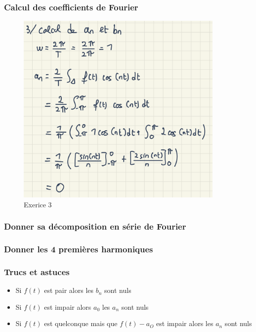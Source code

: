 \documentclass[12pt, a4paper]{article}
\begin{document}
\subsubsection{Calcul des coefficients de Fourier}
\begin{figure}[H]
    \centering
    \includegraphics[width=0.9\textwidth]{img/exo3.png}
    \caption{Exerice 3}
    \label{fig:exo3}
\end{figure}
\subsubsection{Donner sa décomposition en série de Fourier}

\subsubsection{Donner les 4 premières harmoniques}

\subsubsection{Trucs et astuces}

\begin{itemize}
    \item Si $ f(t) $ est pair alors les $ b_{n} $ sont nuls
    \item Si $ f(t) $ est impair alors $ a_{0} $ les $ a_{n} $ sont nuls
    \item Si $ f(t) $ est quelconque mais que $ f(t) - a_{O} $ est impair alors les
    $ a_{n} $ sont nuls 
    
\end{itemize}
\end{document}
